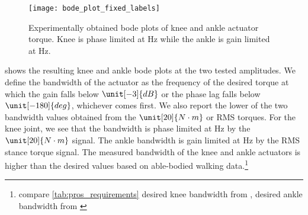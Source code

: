 \begin{figure}[htb]
    \centering 
    \texttt{[image: bode\_plot\_fixed\_labels]}
    \caption[Experimentally obtained bode plots of knee and ankle actuator
    torque]{Experimentally obtained bode plots of knee and ankle actuator
    torque. Knee is phase limited at \unit[24]{Hz} while the ankle is gain
    limited at \unit[7]{Hz}.}\label{fig:pros_eval_bode_plots}
\end{figure}
 shows the resulting knee and ankle bode plots at
the two tested amplitudes. We define the bandwidth of the actuator as the
frequency of the desired torque at which the gain falls below $\unit[-3]{dB}$ or
the phase lag falls below $\unit[-180]{deg}$, whichever comes first. We also
report the lower of the two bandwidth values obtained from the $\unit[20]{N
\cdot m}$ or RMS torques. For the knee joint, we see that the bandwidth is phase
limited at \unit[24]{Hz} by the $\unit[20]{N \cdot m}$ signal. The ankle
bandwidth is gain limited at \unit[7]{Hz} by the RMS stance torque signal. The
measured bandwidth of the knee and ankle actuators is higher than the desired
values based on able-bodied walking data.\footnote{compare
\cref{tab:pros_requirements} desired knee bandwidth from
\citep{sergi2012design}, desired ankle bandwidth from \citet{au2008powered}}


